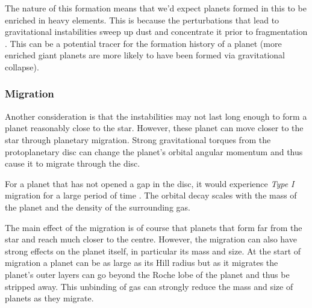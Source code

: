 \documentclass[twocolumn]{aastex631}
\begin{document}
The nature of this formation means that we'd expect planets formed in this to be enriched in heavy elements. This is because the perturbations that lead to gravitational instabilities sweep up dust and concentrate it prior to fragmentation \citep{Kratter+2016}. This can be a potential tracer for the formation history of a planet (more enriched giant planets are more likely to have been formed via gravitational collapse).

\subsubsection{Migration}

Another consideration is that the instabilities may not last long enough to form a planet reasonably close to the star. However, these planet can move closer to the star through planetary migration. Strong gravitational torques from the protoplanetary disc can change the planet's orbital angular momentum and thus cause it to migrate through the disc.

For a planet that has not opened a gap in the disc, it would experience \textit{Type I} migration for a large period of time \citep{Baruteau+2011}. The orbital decay scales with the mass of the planet and the density of the surrounding gas.

The main effect of the migration is of course that planets that form far from the star and reach much closer to the centre. However, the migration can also have strong effects on the planet itself, in particular its mass and size. At the start of migration a planet can be as large as its Hill radius but as it migrates the planet's outer layers can go beyond the Roche lobe of the planet and thus be stripped away. This unbinding of gas can strongly reduce the mass and size of planets as they migrate.
\end{document}
